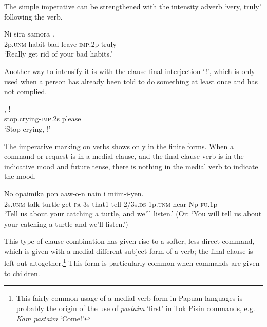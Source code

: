 The simple imperative can be strengthened with the intensity adverb  `very, truly' following the verb.

\ea%
\label{ex:x1073}
\gll Ni  sira  samora  .\\ 
2p.\textsc{unm}  habit  bad  leave-\textsc{imp}.2p  truly\\
\glt `Really get rid of your bad habits.'
\z





Another way to intensify it is with the clause-final interjection  `!', which is only used when a person has already been told to do something at least once and has not complied.

\ea%
\label{ex:x1074}
\gll {},  ! \\
 stop.crying-\textsc{imp}.2s  please     \\
\glt `Stop crying, !'
\z





The imperative marking on verbs shows only in the finite forms. When a command or request is in a medial clause, and the final clause verb is in the indicative mood and future tense, there is nothing in the medial verb to indicate the mood. 

\ea%
\label{ex:x1076}
\gll No  opaimika  pon  aaw-o-n  nain   i  miim-i-yen.\\
2s.\textsc{unm}  talk  turtle  get-\textsc{pa}-3s  that1  tell-2/3s.\textsc{ds} 1p.\textsc{unm}  hear-Np-\textsc{fu}.1p     \\
\glt `Tell us about your catching a turtle, and we'll listen.' (Or: `You will tell us about your catching a turtle and we'll listen.')
\z


This type of clause combination has given rise to a softer, less direct command, which is given with a medial different-subject form of a verb; the final clause is left out altogether.\footnote{This fairly common usage of a medial verb form in Papuan languages is probably the origin of the use of \textit{pastaim} `first' in Tok Pisin commands, e.g. \textit{Kam pastaim} `Come!'}  This form is particularly common when commands are given to children. 

